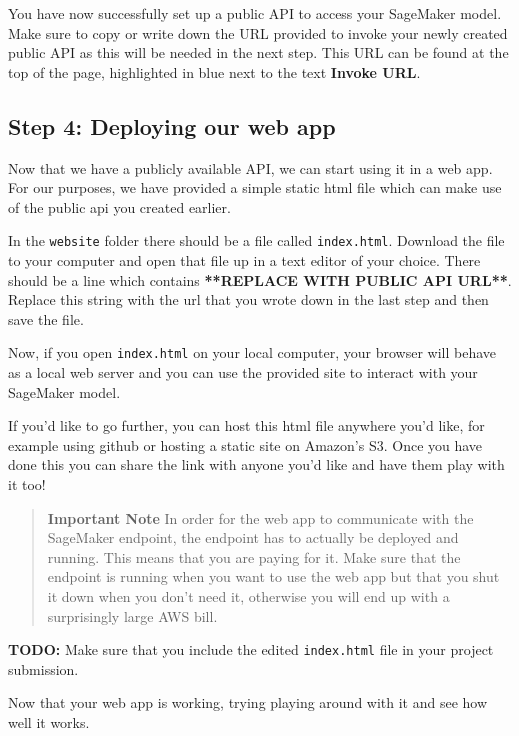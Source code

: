 \documentclass[11pt]{article}
\begin{document}
You have now successfully set up a public API to access your SageMaker
model. Make sure to copy or write down the URL provided to invoke your
newly created public API as this will be needed in the next step. This
URL can be found at the top of the page, highlighted in blue next to the
text \textbf{Invoke URL}.

    \hypertarget{step-4-deploying-our-web-app}{%
\subsection{Step 4: Deploying our web
app}\label{step-4-deploying-our-web-app}}

Now that we have a publicly available API, we can start using it in a
web app. For our purposes, we have provided a simple static html file
which can make use of the public api you created earlier.

In the \texttt{website} folder there should be a file called
\texttt{index.html}. Download the file to your computer and open that
file up in a text editor of your choice. There should be a line which
contains \textbf{**REPLACE WITH PUBLIC API URL**}. Replace this string
with the url that you wrote down in the last step and then save the
file.

Now, if you open \texttt{index.html} on your local computer, your
browser will behave as a local web server and you can use the provided
site to interact with your SageMaker model.

If you'd like to go further, you can host this html file anywhere you'd
like, for example using github or hosting a static site on Amazon's S3.
Once you have done this you can share the link with anyone you'd like
and have them play with it too!

\begin{quote}
\textbf{Important Note} In order for the web app to communicate with the
SageMaker endpoint, the endpoint has to actually be deployed and
running. This means that you are paying for it. Make sure that the
endpoint is running when you want to use the web app but that you shut
it down when you don't need it, otherwise you will end up with a
surprisingly large AWS bill.
\end{quote}

\textbf{TODO:} Make sure that you include the edited \texttt{index.html}
file in your project submission.

    Now that your web app is working, trying playing around with it and see
how well it works.
\end{document}
